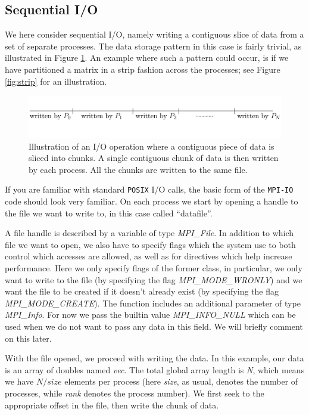 \documentclass[twoside, 11pt, a4paper]{article}
\begin{document}
\subsection{Sequential I/O}
We here consider sequential I/O, namely writing a contiguous slice 
of data from a set of separate processes. The data storage pattern in this case is
fairly trivial, as illustrated in Figure \ref{fig:contigousstorage}. An example
where such a pattern could occur, is if we have partitioned a matrix in a strip
fashion across the processes; see Figure \ref{fig:strip} for an illustration.

\begin{figure}[ht]
	\begin{center}
		\includegraphics[width=12cm]{slicedvector}
	\end{center}
	\caption{Illustration of an I/O operation where a contiguous piece of data
			 is sliced into chunks. A single contiguous chunk of data is then
			 written by each process. All the chunks are written to the same file.}
	\label{fig:contigousstorage}
\end{figure}

If you are familiar with standard \texttt{POSIX} I/O calls, the basic form
of the \texttt{MPI-IO} code should look very familiar.
On each process we start by opening a handle to the file we want to write to, in
this case called ``datafile''.

A file handle is described by a variable of type \emph{MPI\_File}. In addition to
which file we want to open, we also have to specify flags which the system use to both 
control which accesses are allowed, as well as for directives which help increase performance.
Here we only specify flags of the former class, in particular, we only want 
to write to the file (by specifying the flag \emph{MPI\_MODE\_WRONLY}) and 
we want the file to be created if it doesn't already exist (by specifying the flag 
\emph{MPI\_MODE\_CREATE}). The function includes an
additional parameter of type \emph{MPI\_Info}. For now we pass the builtin value
\emph{MPI\_INFO\_NULL} which can be used when we do not want to pass any data in
this field. We will briefly comment on this later.

With the file opened, we proceed with writing the data. In this example,
our data is an array of doubles named \emph{vec}. The total global array length
is \emph{N}, which means we have $N/size$ elements per process (here \emph{size}, as
usual, denotes the number of processes, while \emph{rank} denotes the process number).
We first seek to the appropriate offset in the file, then write the chunk of data.

\end{document}
